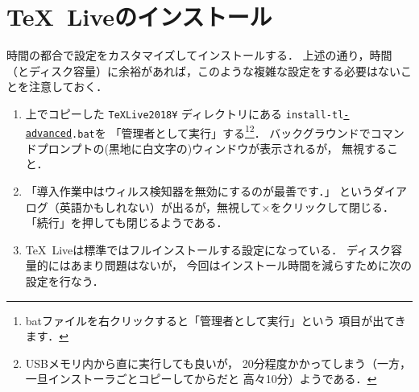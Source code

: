 \documentclass{ltjsarticle}
\begin{document}
\newpage
\section{\TeX~Liveのインストール}
時間の都合で設定をカスタマイズしてインストールする．
上述の通り，時間（とディスク容量）に余裕があれば，このような複雑な設定をする必要はないことを注意しておく．
\begin{enumerate}
  \itemsep\medskipamount


\item 上でコピーした \texttt{TeXLive2018¥} ディレクトリにある
  \texttt{install-tl\underline{-advanced}.bat}を
  「管理者として実行」する\footnote{%
    batファイルを右クリックすると「管理者として実行」という
    項目が出てきます．
  }\footnote{%
    USBメモリ内から直に実行しても良いが，
    20分程度かかってしまう（一方，一旦インストーラごとコピーしてからだと
    高々10分）ようである．
  }．
  \smallskip
  バックグラウンドでコマンドプロンプトの(黒地に白文字の)ウィンドウが表示されるが，
  無視すること．

\item 「導入作業中はウィルス検知器を無効にするのが最善です．」
  というダイアログ（英語かもしれない）が出るが，無視して×をクリックして閉じる．
  「続行」を押しても閉じるようである．

\item \TeX~Liveは標準ではフルインストールする設定になっている．
  ディスク容量的にはあまり問題はないが，
  今回はインストール時間を減らすために次の設定を行なう．


\end{enumerate}
\end{document}

